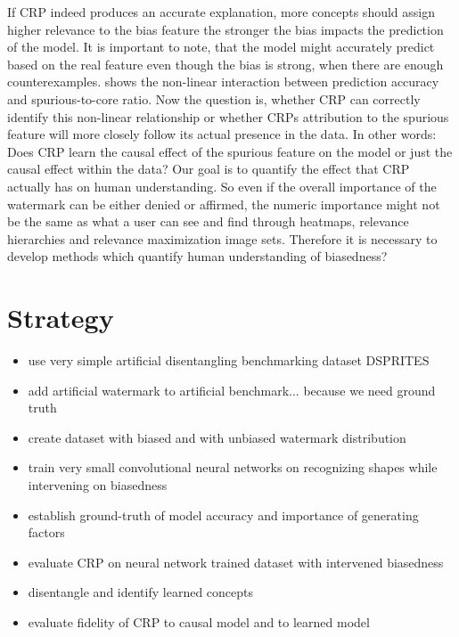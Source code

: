 If CRP indeed produces an accurate explanation, more concepts should assign higher relevance to the bias feature the stronger the bias impacts the prediction of the model. It is important to note, that the model might accurately predict based on the real feature even though the bias is strong, when there are enough counterexamples.  shows the non-linear interaction between prediction accuracy and spurious-to-core ratio.
Now the question is, whether CRP can correctly identify this non-linear relationship or whether CRPs attribution to the spurious feature will more closely follow its actual presence in the data. 
In other words: Does CRP learn the causal effect of the spurious feature on the model or just the causal effect within the data? Our goal is to quantify the effect that CRP actually has on human understanding. So even if the overall importance of the watermark can be either denied or affirmed, the numeric importance might not be the same as what a user can see and find through heatmaps, relevance hierarchies and relevance maximization image sets. Therefore it is necessary to develop methods which quantify human understanding of biasedness?  

\section{Strategy}
\begin{itemize}
    \item use very simple artificial disentangling benchmarking dataset DSPRITES
    \item add artificial watermark to artificial benchmark... because we need ground truth
    \item create dataset with biased and with unbiased watermark distribution
    \item train very small convolutional neural networks on recognizing shapes while intervening on biasedness
    \item establish ground-truth of model accuracy and importance of generating factors
    \item evaluate CRP on neural network trained dataset with intervened biasedness
    \item disentangle and identify learned concepts
    \item evaluate fidelity of CRP to causal model and to learned model
\end{itemize}

